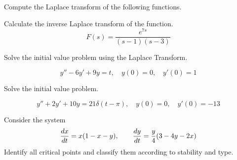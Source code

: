 \documentclass[12pt]{exam}
\begin{document}
    


\newpage


\begin{questions}



    \question[15] 
    Compute the Laplace transform of the following functions. 
    
    \question[5] %
    Calculate the inverse Laplace transform of the function. 
    $$F(s) = \frac{e^{7s}}{(s-1)(s-3)}$$

    
    \question[10] Solve the initial value problem using the Laplace Transform. 
    
    $$y'' -6y' +9y = t, \quad y(0) =0, \quad y'(0) =1 $$
    
    \question[10] %
    Solve the initial value problem. 

    $$y'' + 2y' + 10y = 21\delta(t-\pi) , \quad y(0) = 0, \quad y'(0) = -13$$
        
    \question[10] 
    Consider the system $${\frac{dx}{dt}} = x(1-x-y), \qquad {\frac{dy}{dt}} = \frac y4 (3-4y -2x)$$
    Identify all critical points and classify them according to stability and type. 
\end{questions}
\end{document}
